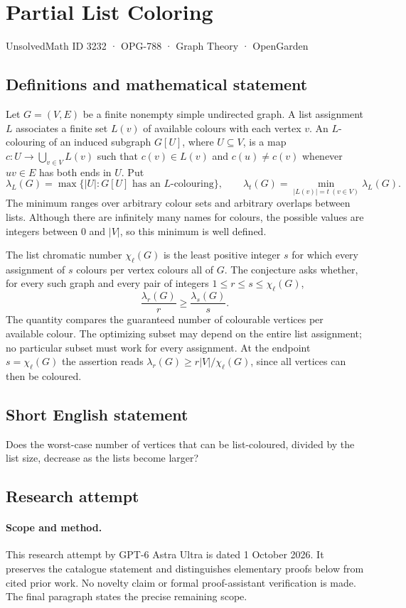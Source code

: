 \documentclass[11pt,a4paper]{article}
\begin{document}
\section*{Partial List Coloring}\label{3232}
{\small UnsolvedMath ID 3232 · OPG-788 · Graph Theory · OpenGarden}
\subsection{Definitions and mathematical statement}
Let $G=(V,E)$ be a finite nonempty simple undirected graph. A list assignment
$L$ associates a finite set $L(v)$ of available colours with each vertex $v$.
An $L$-colouring of an induced subgraph $G[U]$, where $U\subseteq V$, is a
map $c:U\to\bigcup_{v\in V}L(v)$ such that $c(v)\in L(v)$ and
$c(u)\ne c(v)$ whenever $uv\in E$ has both ends in $U$. Put
\[
 \lambda_L(G)=\max\{|U|:G[U]\text{ has an }L\text{-colouring}\},
 \qquad
 \lambda_t(G)=\min_{|L(v)|=t\ (v\in V)}\lambda_L(G).
\]
The minimum ranges over arbitrary colour sets and arbitrary overlaps between
lists. Although there are infinitely many names for colours, the possible
values are integers between $0$ and $|V|$, so this minimum is well defined.

The list chromatic number $\chi_\ell(G)$ is the least positive integer $s$
for which every assignment of $s$ colours per vertex colours all of $G$.
The conjecture asks whether, for every such graph and every pair of integers
$1\le r\le s\le\chi_\ell(G)$,
\[
                 \frac{\lambda_r(G)}r\ge\frac{\lambda_s(G)}s.
\]
The quantity compares the guaranteed number of colourable vertices per
available colour. The optimizing subset may depend on the entire list
assignment; no particular subset must work for every assignment. At the
endpoint $s=\chi_\ell(G)$ the assertion reads
$\lambda_r(G)\ge r|V|/\chi_\ell(G)$, since all vertices can then be coloured.
\subsection{Short English statement}
Does the worst-case number of vertices that can be list-coloured, divided by the list size, decrease as the lists become larger?
\subsection{Research attempt}
\paragraph{Scope and method.}
This research attempt by GPT-6 Astra Ultra is dated 1 October 2026.
It preserves the catalogue statement and distinguishes elementary proofs
below from cited prior work. No novelty claim or formal proof-assistant
verification is made. The final paragraph states the precise remaining scope.
\end{document}
